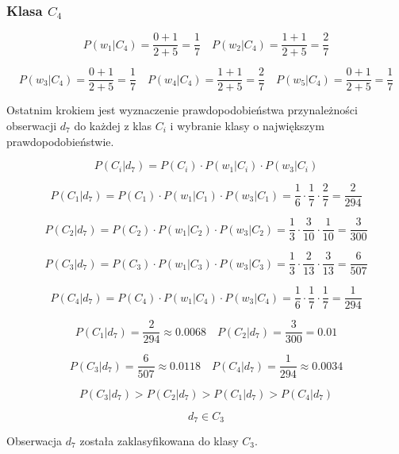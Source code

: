 \documentclass{article}
\begin{document}
\subsubsection*{Klasa $C_4$}

\begin{equation*}
    P(w_1|C_4) = \frac{0 + 1}{2 + 5} = \frac{1}{7} \quad P(w_2|C_4) = \frac{1 + 1}{2 + 5} = \frac{2}{7}
\end{equation*}

\begin{equation*}
    P(w_3|C_4) = \frac{0 + 1}{2 + 5} = \frac{1}{7} \quad P(w_4|C_4) = \frac{1 + 1}{2 + 5} = \frac{2}{7} \quad P(w_5|C_4) = \frac{0 + 1}{2 + 5} = \frac{1}{7}
\end{equation*}

Ostatnim krokiem jest wyznaczenie prawdopodobieństwa przynależności obserwacji $d_7$
do każdej z klas $C_i$ i wybranie klasy o największym prawdopodobieństwie.

\begin{equation}
    P(C_i|d_7) = P(C_i) \cdot P(w_1|C_i) \cdot P(w_3|C_i)
    \label{eq:eq2}
\end{equation}

\begin{equation*}
    P(C_1|d_7) = P(C_1) \cdot P(w_1|C_1) \cdot P(w_3|C_1) = \frac{1}{6} \cdot \frac{1}{7} \cdot \frac{2}{7} = \frac{2}{294}
\end{equation*}

\begin{equation*}
    P(C_2|d_7) = P(C_2) \cdot P(w_1|C_2) \cdot P(w_3|C_2) = \frac{1}{3} \cdot \frac{3}{10} \cdot \frac{1}{10} = \frac{3}{300}
\end{equation*}

\begin{equation*}
    P(C_3|d_7) = P(C_3) \cdot P(w_1|C_3) \cdot P(w_3|C_3) = \frac{1}{3} \cdot \frac{2}{13} \cdot \frac{3}{13} = \frac{6}{507}
\end{equation*}

\begin{equation*}
    P(C_4|d_7) = P(C_4) \cdot P(w_1|C_4) \cdot P(w_3|C_4) = \frac{1}{6} \cdot \frac{1}{7} \cdot \frac{1}{7} = \frac{1}{294}
\end{equation*}

\begin{equation*}
    P(C_1|d_7) = \frac{2}{294} \approx 0.0068 \quad P(C_2|d_7) = \frac{3}{300} = 0.01
\end{equation*}

\begin{equation*}
    P(C_3|d_7) = \frac{6}{507} \approx 0.0118 \quad P(C_4|d_7) = \frac{1}{294} \approx 0.0034
\end{equation*}

\begin{equation*}
    P(C_3|d_7) > P(C_2|d_7) > P(C_1|d_7) > P(C_4|d_7)
\end{equation*}

\begin{equation*}
    d_7 \in C_3
\end{equation*}

Obserwacja $d_7$ została zaklasyfikowana do klasy $C_3$.
\end{document}
